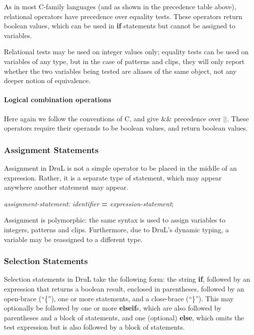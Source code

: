 \documentclass[11pt,twoside]{article}
\begin{document}
As in most C-family languages (and as shown in the precedence table above), relational operators have precedence over equality tests.  These operators return boolean values, which can be used in \textbf{if} statements but cannot be assigned to variables.

Relational tests may be used on integer values only; equality tests can be used on variables of any type, but in the case of patterns and clips, they will only report whether the two variables being tested are  aliases of the same object, not any deeper notion of equivalence.

\paragraph{Logical combination operations}

Here again we follow the conventions of C, and give $\&\&$ precedence over $||$.  These operators require their operands to be boolean values, and return boolean values.

\subsubsection{Assignment Statements}

Assignment in DruL is not a simple operator to be placed in the middle of an expression.  Rather, it is a separate type of statement, which may appear anywhere another statement may appear.  

\begin{center}
\emph{assignment-statement}: \emph{identifier} \textbf{=}  \emph{expression-statement};
\end{center}

Assignment is polymorphic: the same syntax is used to assign variables to
integers, patterns and clips. Furthermore, due to DruL's dynamic typing,
a variable may be reassigned to a different type.

\subsubsection{Selection Statements}

Selection statements in DruL take the following form: the string \textbf{if}, followed by an expression that returns a boolean result, enclosed in parentheses, followed by an open-brace (``\{''), one or more statements, and a close-brace (``\}'').  This may optionally be followed by one or more \textbf{elseif}s, which are also followed by parentheses and a block of statements, and one (optional) \textbf{else}, which omits the test expression but is also followed by a block of statements.
\end{document}
